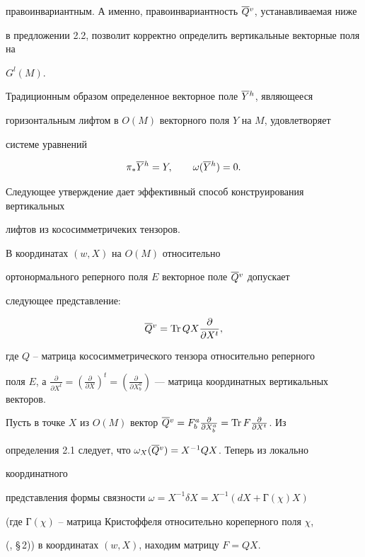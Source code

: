 правоинвариантным. А именно, правоинвариантность $\overline {Q}{}^v$, устанавливаемая ниже


в предложении 2.2, позволит корректно определить вертикальные векторные поля на


$G^l(M)$.


Традиционным образом определенное векторное поле $\overline {Y}{}^h$, являющееся


горизонтальным лифтом в $O(M)$ векторного поля $Y$ на $M$, удовлетворяет


системе уравнений


\begin{equation}


\pi _*\olh Y=Y,\qquad \omega (\olh Y)=0.


\end{equation}


Следующее утверждение дает эффективный способ конструирования вертикальных


лифтов из кососимметричеких тензоров.





\begin{props} В координатах $(w,X)$ на $O(M)$ относительно


ортонормального реперного поля $E$ векторное поле $\overline {Q}{}^v$ допускает


следующее представление:


\begin{equation}


\olv Q =\Tr QX\frac \partial{\partial X^t},


\end{equation}


где $Q$ -- матрица кососимметрического тензора относительно реперного


поля $E$, а $\frac \partial {\partial X^t}=(\frac \partial {\partial X})^t=


(\frac \partial {\partial X^a_b})$ --- матрица координатных вертикальных векторов.


\end{props}





\begin{pf} Пусть в точке $X$ из $O(M)$ вектор $\olv Q=F^a_b


\frac \partial {\partial X^a_b}=\Tr F\frac \partial {\partial X^t}$. Из


определения 2.1 следует, что $\omega _X(\overline {Q}{}^v)=X^{-1}QX$. Теперь из локально


координатного


представления формы связности $\omega = X^{-1}\delta X=X^{-1}(dX+Г(\chi )X)$


(где $Г(\chi )$ -- матрица Кристоффеля относительно кореперного поля $\chi $,


(\cite{Far1}, \S\,2)) в координатах $(w,X)$, находим матрицу $F=QX$.


\end{pf}





